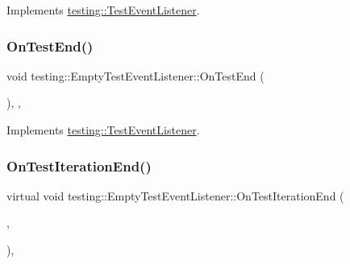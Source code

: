 Implements \mbox{\hyperlink{classtesting_1_1_test_event_listener_abb1c44525ef038500608b5dc2f17099b}{testing\+::\+Test\+Event\+Listener}}.

\mbox{\label{classtesting_1_1_empty_test_event_listener_a709d7077c086c877d214231bc520ef90}} 
\subsubsection{\texorpdfstring{OnTestEnd()}{OnTestEnd()}\hspace{0.1cm}{\footnotesize\ttfamily [3/3]}}
{\footnotesize\ttfamily void testing\+::\+Empty\+Test\+Event\+Listener\+::\+On\+Test\+End (\begin{DoxyParamCaption}\item[{const \mbox{\hyperlink{classtesting_1_1_test_info}{Test\+Info}} \&}]{ }\end{DoxyParamCaption})\hspace{0.3cm}{\ttfamily [inline]}, {\ttfamily [override]}, {\ttfamily [virtual]}}



Implements \mbox{\hyperlink{classtesting_1_1_test_event_listener_abb1c44525ef038500608b5dc2f17099b}{testing\+::\+Test\+Event\+Listener}}.

\mbox{\label{classtesting_1_1_empty_test_event_listener_a2253e5a18b3cf7bccd349567a252209d}} 
\subsubsection{\texorpdfstring{OnTestIterationEnd()}{OnTestIterationEnd()}\hspace{0.1cm}{\footnotesize\ttfamily [1/3]}}
{\footnotesize\ttfamily virtual void testing\+::\+Empty\+Test\+Event\+Listener\+::\+On\+Test\+Iteration\+End (\begin{DoxyParamCaption}\item[{const \mbox{\hyperlink{classtesting_1_1_unit_test}{Unit\+Test}} \&}]{,  }\item[{int}]{ }\end{DoxyParamCaption})\hspace{0.3cm}{\ttfamily [inline]}, {\ttfamily [virtual]}}



